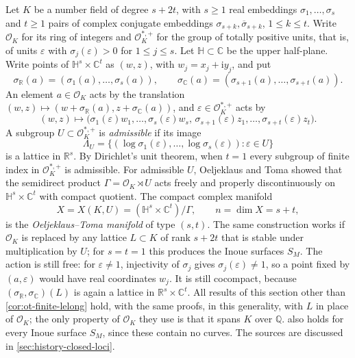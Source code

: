 Let $K$ be a number field of degree $s+2t$, with $s\geq1$ real embeddings $\sigma_1,\ldots,\sigma_s$ and $t\geq1$ pairs of complex conjugate embeddings $\sigma_{s+k},\overline{\sigma}_{s+k}$, $1\leq k\leq t$. Write $\mathcal O_K$ for its ring of integers and $\mathcal O_K^{*,+}$ for the group of totally positive units, that is, of units $\varepsilon$ with $\sigma_j(\varepsilon)>0$ for $1\leq j\leq s$. Let $\mathbb H\subset\mathbb C$ be the upper half-plane. Write points of $\mathbb H^s\times\mathbb C^t$ as $(w,z)$, with $w_j=x_j+\mathrm i y_j$, and put
\[
 \sigma_{\mathbb R}(a)=(\sigma_1(a),\ldots,\sigma_s(a)),\qquad
 \sigma_{\mathbb C}(a)=(\sigma_{s+1}(a),\ldots,\sigma_{s+t}(a)).
\]
An element $a\in\mathcal O_K$ acts by the translation $(w,z)\mapsto(w+\sigma_{\mathbb R}(a),z+\sigma_{\mathbb C}(a))$, and $\varepsilon\in\mathcal O_K^{*,+}$ acts by
\[
 (w,z)\longmapsto\bigl(\sigma_1(\varepsilon)w_1,\ldots,\sigma_s(\varepsilon)w_s,\,
       \sigma_{s+1}(\varepsilon)z_1,\ldots,\sigma_{s+t}(\varepsilon)z_t\bigr).
\]
A subgroup $U\subset\mathcal O_K^{*,+}$ is \emph{admissible} if its image
\[
 \Lambda_U=\{(\log\sigma_1(\varepsilon),\ldots,\log\sigma_s(\varepsilon)):\varepsilon\in U\}
\]
is a lattice in $\mathbb R^s$. By Dirichlet's unit theorem, when $t=1$ every subgroup of finite index in $\mathcal O_K^{*,+}$ is admissible. For admissible $U$, Oeljeklaus and Toma showed that the semidirect product $\Gamma=\mathcal O_K\rtimes U$ acts freely and properly discontinuously on $\mathbb H^s\times\mathbb C^t$ with compact quotient. The compact complex manifold
\[
 X=X(K,U)=(\mathbb H^s\times\mathbb C^t)/\Gamma,
 \qquad n=\dim X=s+t,
\]
is the \emph{Oeljeklaus--Toma manifold} of type $(s,t)$. The same construction works if $\mathcal O_K$ is replaced by any lattice $L\subset K$ of rank $s+2t$ that is stable under multiplication by $U$; for $s=t=1$ this produces the Inoue surfaces $S_M$. The action is still free: for $\varepsilon\neq1$, injectivity of $\sigma_j$ gives $\sigma_j(\varepsilon)\neq1$, so a point fixed by $(a,\varepsilon)$ would have real coordinates $w_j$. It is still cocompact, because $(\sigma_{\mathbb R},\sigma_{\mathbb C})(L)$ is again a lattice in $\mathbb R^s\times\mathbb C^t$. All results of this section other than \cref{cor:ot-finite-lelong} hold, with the same proofs, in this generality, with $L$ in place of $\mathcal O_K$; the only property of $\mathcal O_K$ they use is that it spans $K$ over $\mathbb Q$.  also holds for every Inoue surface $S_M$, since these contain no curves. The sources are discussed in \cref{sec:history-closed-loci}.

